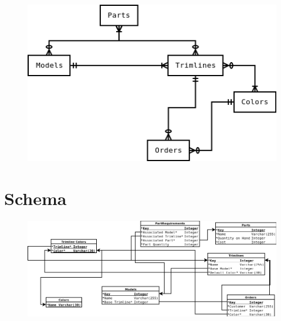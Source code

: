 \documentclass[11pt,letterpaper,oneside]{amsart}
\begin{document}
\begin{figure}[H]
	\centerline{\includegraphics[scale=1.2]{erddraft.png}}
\end{figure}

\section*{Schema}

\begin{figure}[H]
	\centerline{\includegraphics[scale=.55]{schema.png}}
\end{figure}
\end{document}
